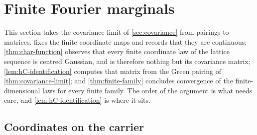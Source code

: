 %
%
\section{Finite Fourier marginals}\label{sec:marginals}

This section takes the covariance limit of \cref{sec:covariance} from pairings
to matrices.  fixes the finite coordinate maps and
records that they are continuous; \cref{thm:char-function} observes that every
finite coordinate law of the lattice sequence is centred Gaussian, and is
therefore nothing but its covariance matrix; \cref{lem:hC-identification}
computes that matrix from the Green pairing of \cref{thm:covariance-limit}; and
\cref{thm:finite-family} concludes convergence of the finite-dimensional laws
for every finite family. The order of the argument is what needs care, and
\cref{lem:hC-identification} is where it sits.

\subsection{Coordinates on the carrier}

